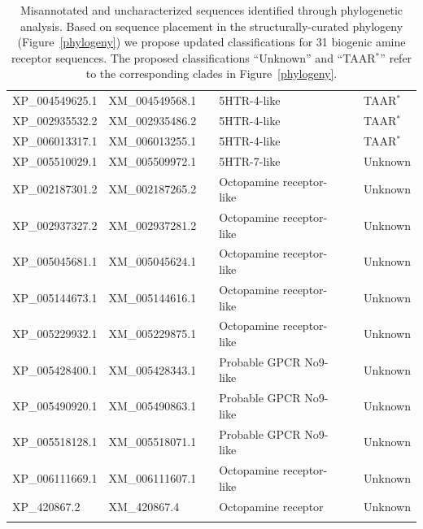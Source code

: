 \documentclass[fleqn,10pt]{wlpeerj}
\begin{document}
\begin{table}[htbp]
\begin{tabular}{l l l l l l}
		XP\_004549625.1 & XM\_004549568.1 & \qquad \qquad & 5HTR-4-like & \qquad \qquad & TAAR$^\ast$ \\
		XP\_002935532.2 & XM\_002935486.2 & \qquad \qquad & 5HTR-4-like & \qquad \qquad & TAAR$^\ast$ \\
		XP\_006013317.1 & XM\_006013255.1 & \qquad \qquad & 5HTR-4-like & \qquad \qquad & TAAR$^\ast$ \\	
		XP\_005510029.1 & XM\_005509972.1 & \qquad \qquad & 5HTR-7-like & \qquad \qquad & Unknown \\
		XP\_002187301.2 & XM\_002187265.2 & \qquad \qquad & Octopamine receptor-like & \qquad \qquad & Unknown \\
		XP\_002937327.2 & XM\_002937281.2 & \qquad \qquad & Octopamine receptor-like & \qquad \qquad & Unknown \\
		XP\_005045681.1 & XM\_005045624.1 & \qquad \qquad & Octopamine receptor-like & \qquad \qquad & Unknown \\
		XP\_005144673.1 & XM\_005144616.1 & \qquad \qquad & Octopamine receptor-like & \qquad \qquad & Unknown \\
		XP\_005229932.1 & XM\_005229875.1 & \qquad \qquad & Octopamine receptor-like & \qquad \qquad & Unknown \\
		XP\_005428400.1 & XM\_005428343.1 & \qquad \qquad & Probable GPCR No9-like & \qquad \qquad & Unknown \\
		XP\_005490920.1 & XM\_005490863.1 & \qquad \qquad & Probable GPCR No9-like & \qquad \qquad & Unknown \\
		XP\_005518128.1 & XM\_005518071.1 & \qquad \qquad & Probable GPCR No9-like & \qquad \qquad & Unknown \\
		XP\_006111669.1 & XM\_006111607.1 & \qquad \qquad & Octopamine receptor-like & \qquad \qquad & Unknown \\
		XP\_420867.2 & XM\_420867.4 & \qquad \qquad & Octopamine receptor & \qquad \qquad & Unknown \\
		\noalign{\smallskip}\hline\noalign{\smallskip} 
	\end{tabular}
	\caption{\label{tab:classif} Misannotated and uncharacterized sequences identified through phylogenetic analysis. Based on sequence placement in the structurally-curated phylogeny (Figure~\ref{phylogeny}) we propose updated classifications for 31 biogenic amine receptor sequences. The proposed classifications ``Unknown'' and ``TAAR$^\ast$'' refer to the corresponding clades in Figure~\ref{phylogeny}.}
\end{table}
\end{document}
